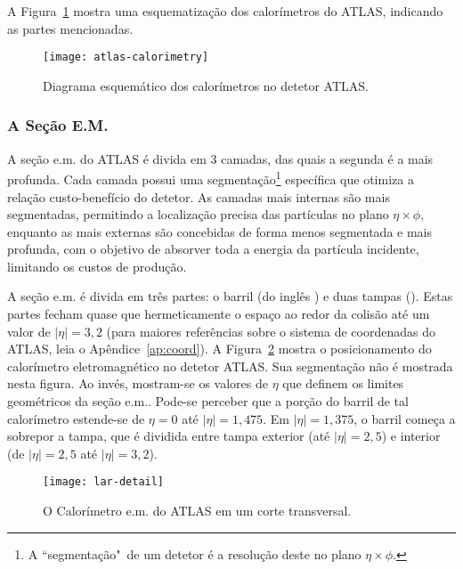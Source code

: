 A Figura~\ref{fig:calo-general} mostra uma esquematização dos calorímetros do
ATLAS, indicando as partes mencionadas.

\begin{figure}
\begin{center}
\texttt{[image: atlas-calorimetry]}
\end{center}
\caption{Diagrama esquemático dos calorímetros no detetor ATLAS.}
\label{fig:calo-general}
\end{figure}

\subsubsection{A Seção E.M.}

A seção e.m. do ATLAS é divida em 3 camadas, das quais a segunda é a mais
profunda. Cada camada possui uma segmentação\footnote{A ``segmentação"\ de um
detetor é a resolução deste no plano $\eta\times\phi$.} específica que otimiza
a relação custo-benefício do detetor. As camadas mais internas são mais
segmentadas, permitindo a localização precisa das partículas no plano
$\eta\times\phi$, enquanto as mais externas são concebidas de forma menos
segmentada e mais profunda, com o objetivo de absorver toda a energia da
partícula incidente, limitando os custos de produção. 

A seção e.m. é divida em três partes: o barril (do inglês
) e duas tampas (). Estas partes fecham quase que
hermeticamente o espaço ao redor da colisão até um valor de $|\eta|=3,2$ (para
maiores referências sobre o sistema de coordenadas do ATLAS, leia o
Apêndice~\ref{ap:coord}). A Figura~\ref{fig:lar-pos} mostra o posicionamento
do calorímetro eletromagnético no detetor ATLAS. Sua segmentação não é
mostrada nesta figura. Ao invés, mostram-se os valores de $\eta$ que definem
os limites geométricos da seção e.m.. Pode-se perceber que a porção do barril
de tal calorímetro estende-se de $\eta=0$ até $|\eta|=1,475$. Em
$|\eta|=1,375$, o barril começa a sobrepor a tampa, que é dividida entre tampa
exterior (até $|\eta|=2,5$) e interior (de $|\eta|=2,5$ até $|\eta|=3,2$).

\begin{figure}
\begin{center}
\texttt{[image: lar-detail]}
\end{center}
\caption{O Calorímetro e.m. do ATLAS em um corte transversal.}
\label{fig:lar-pos}
\end{figure}

